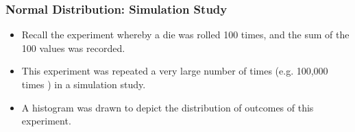 
\begin{frame}

\frametitle{Normal Distribution: Simulation Study}
\begin{itemize}
\item
Recall the experiment whereby a die was rolled 100 times, and the sum of the 100 values was recorded.\smallskip
\item
This experiment was repeated a very large number of times (e.g. 100,000 times ) in a simulation study.\smallskip
\item
A histogram was drawn to depict the distribution of outcomes of this experiment.


\end{itemize}
\end{frame}



